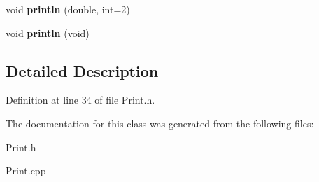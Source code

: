 \begin{DoxyCompactItemize}
\item 
\hypertarget{classPrint_a4302b58946b9355b0491118227beed07}{
void {\bfseries println} (double, int=2)}
\label{classPrint_a4302b58946b9355b0491118227beed07}

\item 
\hypertarget{classPrint_a525b37c566658ff8113a067f6e8d5bf1}{
void {\bfseries println} (void)}
\label{classPrint_a525b37c566658ff8113a067f6e8d5bf1}

\end{DoxyCompactItemize}


\subsection{\-Detailed \-Description}


\-Definition at line 34 of file \-Print.\-h.



\-The documentation for this class was generated from the following files\-:\begin{DoxyCompactItemize}
\item 
\-Print.\-h\item 
\-Print.\-cpp\end{DoxyCompactItemize}
